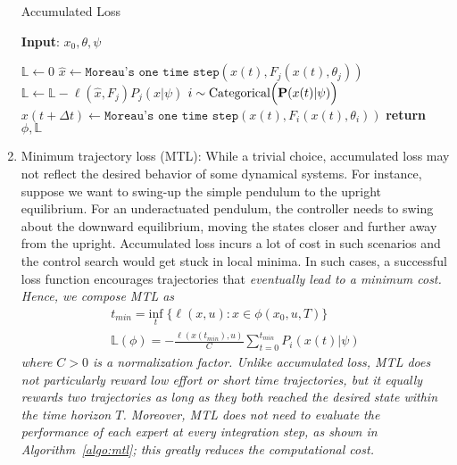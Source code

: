 \begin{enumerate}
    \begin{algorithm}[H]
        \caption{Accumulated Loss}
        \label{algo:accumulated_loss}
        \small
        \hspace*{\algorithmicindent} \textbf{Input}: $x_0, \theta, \psi$
        \begin{algorithmic}[1]
            \State $\mathbb{L} \leftarrow 0$
                    \State $\hat{x} \leftarrow \texttt{Moreau's one time step}(x(t), F_j(x(t), \theta_j))$
                    \State $\mathbb{L} \leftarrow \mathbb{L} - \ell(\hat{x}, F_j)P_j(\hat{x} | \psi)$
                \EndFor
                \State $i \sim \text{Categorical}\Bigl(\mathbf{P}(x(t)| \psi)\Bigr)$ 
                \State $x(t + \Delta t) \leftarrow \texttt{Moreau's one time step}(x(t), F_i(x(t), \theta_i))$
                \EndFor
            \State \textbf{return} $\phi, \mathbb{L}$
        \end{algorithmic}
    \end{algorithm}
  
    \item Minimum trajectory loss (MTL): While a trivial choice, accumulated
    loss may not reflect the desired behavior of some dynamical systems.
    For instance, suppose we want to swing-up the simple pendulum to the upright
    equilibrium. 
    For an underactuated pendulum, the controller needs to swing about the
    downward equilibrium, moving the states closer and further away from the
    upright.
    Accumulated loss incurs a lot of cost in such scenarios and the control
    search would get stuck in local minima.
    In such cases, a successful loss function encourages trajectories that
    \it{eventually} \normalfont lead to a minimum cost.
    Hence, we compose MTL as
    \begin{equation}
        \begin{gathered}
            t_{min} = \underset{t}{\textrm{inf}} \; \{ \ell(x, u): x \in \phi(x_0, u, T) \}  \\
            \mathbb{L}(\phi) = - \frac{\ell(x(t_{min}), u)}{C} \sum_{t=0}^{t_{min}}P_i(x(t) | \psi) 
        \end{gathered} 
    \end{equation}
    \noindent where $C > 0$ is a normalization factor.
    Unlike accumulated loss, MTL does not particularly reward low effort or
    short time trajectories, but it equally rewards two trajectories
    as long as they both reached the desired state within the time horizon $T$. 
    Moreover, MTL does not need to evaluate the performance of each expert at
    every integration step, as shown in Algorithm~\eqref{algo:mtl}; this greatly
    reduces the computational cost.
    

\end{enumerate}
